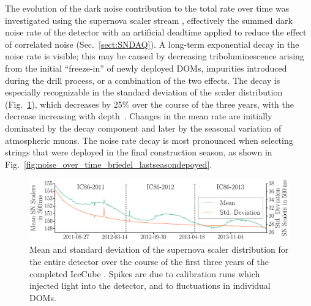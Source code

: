 The evolution of the dark noise contribution to the total rate over time was investigated using the
supernova scaler stream \cite{IC3:supernova, briedel_phd}, effectively 
the summed dark noise rate of the detector with an artificial deadtime
applied to reduce the effect of correlated noise
(Sec.~\ref{sect:SNDAQ}). A long-term exponential decay in 
the noise rate is visible; this may be caused by 
decreasing triboluminescence \cite{ice_tribo} arising from the initial ``freeze-in''
of newly deployed DOMs, impurities introduced during the drill
process, or a combination of the two effects.  The decay
is especially recognizable in the standard deviation of the scaler
distribution (Fig.~\ref{fig:noise_over_time_briedel}), which decreases by
25\% over the course of the three years, with the decrease increasing with
depth~\cite{Piegsa09}. Changes in the mean rate are
initially dominated by the decay component and later by the seasonal
variation of atmospheric muons. The noise
rate decay is most pronounced when selecting strings
that were deployed in the final construction season, as shown in
Fig.~\ref{fig:noise_over_time_briedel_lastseasondepoyed}.


\begin{figure}[!h]
 \centering
 \includegraphics[width=1.0\textwidth]{graphics/dom/performance/darknoise/SN_Scalers_Whole_Detector_Mean_Variance_IC86_2011_2012_2013_smaller_height.pdf}
 \caption{Mean and standard deviation of the supernova scaler distribution for the
   entire detector over the course of the first three years of the
   completed IceCube \cite{briedel_phd}. Spikes are due to calibration
 runs which injected light into the detector, and to fluctuations in
 individual DOMs.} 
 \label{fig:noise_over_time_briedel}
\end{figure}

